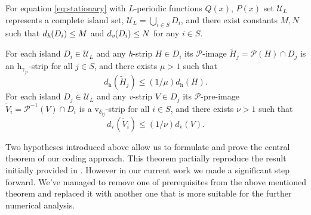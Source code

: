 \begin{hypothesis}
\label{hypothesis:island-set}
	For equation \eqref{eq:stationary} with $L$-periodic functions $Q(x)$, $P(x)$ set $\mathscr{U}_L$ represents a complete island set, $\mathscr{U}_L = \bigcup_{i \in S} D_i$, and there exist constants $M, N$ such that $d_{\emph{h}}(D_i) \le M$ and $d_{\emph{v}}(D_i) \le N$ for any $i \in S$.
\end{hypothesis}

\begin{hypothesis}
\label{hypothesis:strips-mapping}
	For each island $D_i \in \mathscr{U}_L$ and any \emph{h}-strip $H \in D_i$ its $\mathcal{P}$-image $\widetilde{H}_j = \mathcal{P}(H) \cap D_j$ is an $\mathrm{h}_{\gamma_{ji}}$-strip for all $j \in S$, and there exists $\mu > 1$ such that
	\begin{equation}
		d_{\mathrm{h}}(\widetilde{H}_j) \le (1/\mu) d_{\mathrm{h}}(H).
	\end{equation}
	For each island $D_j \in \mathscr{U}_L$ and any \emph{v}-strip $V \in D_j$ its $\mathcal{P}$-pre-image $\widetilde{V}_i = \mathcal{P}^{-1}(V) \cap D_i$ is a $\mathrm{v}_{\delta_{ij}}$-strip for all $i \in S$, and there exists $\nu > 1$ such that
	\begin{equation}
		d_{\mathrm{v}}(\widetilde{V}_i) \le (1/\nu) d_{\mathrm{v}}(V).
	\end{equation}
\end{hypothesis}

Two hypotheses introduced above allow us to formulate and prove the central theorem of our coding approach.
This theorem partially reproduce the result initially provided in \cite[Theorem 3.1]{AlfimovAvramenko}.
However in our current work we made a significant step forward.
We've managed to remove one of prerequisites from the above mentioned theorem and replaced it with another one that is more suitable for the further numerical analysis.

